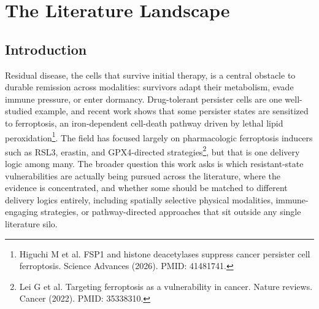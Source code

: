 \documentclass[11pt,twoside,openright]{report}
\begin{document}
\chapter{The Literature Landscape}


\section{Introduction}


Residual disease, the cells that survive initial therapy, is a central obstacle to durable remission across modalities: survivors adapt their metabolism, evade immune pressure, or enter dormancy. Drug-tolerant persister cells are one well-studied example, and recent work shows that some persister states are sensitized to ferroptosis, an iron-dependent cell-death pathway driven by lethal lipid peroxidation\footnote{Higuchi M et al. FSP1 and histone deacetylases suppress cancer persister cell ferroptosis. Science Advances (2026). PMID: 41481741.}. The field has focused largely on pharmacologic ferroptosis inducers such as RSL3, erastin, and GPX4-directed strategies\footnote{Lei G et al. Targeting ferroptosis as a vulnerability in cancer. Nature reviews. Cancer (2022). PMID: 35338310.}, but that is one delivery logic among many. The broader question this work asks is which resistant-state vulnerabilities are actually being pursued across the literature, where the evidence is concentrated, and whether some should be matched to different delivery logics entirely, including spatially selective physical modalities, immune-engaging strategies, or pathway-directed approaches that sit outside any single literature silo.
\end{document}
